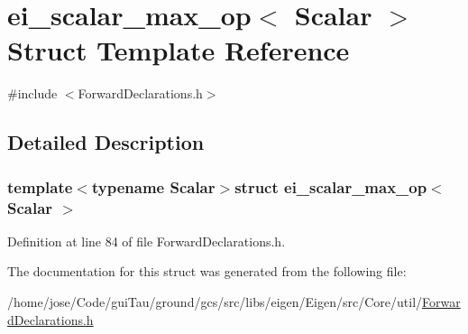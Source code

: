 \hypertarget{structei__scalar__max__op}{\section{ei\-\_\-scalar\-\_\-max\-\_\-op$<$ Scalar $>$ Struct Template Reference}
\label{structei__scalar__max__op}
}


{\ttfamily \#include $<$Forward\-Declarations.\-h$>$}



\subsection{Detailed Description}
\subsubsection*{template$<$typename Scalar$>$struct ei\-\_\-scalar\-\_\-max\-\_\-op$<$ Scalar $>$}



Definition at line 84 of file Forward\-Declarations.\-h.



The documentation for this struct was generated from the following file\-:\begin{DoxyCompactItemize}
\item 
/home/jose/\-Code/gui\-Tau/ground/gcs/src/libs/eigen/\-Eigen/src/\-Core/util/\hyperlink{_forward_declarations_8h}{Forward\-Declarations.\-h}\end{DoxyCompactItemize}
